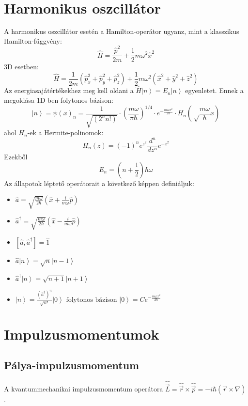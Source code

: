\documentclass[12pt]{article}
\theoremstyle{plain}
\newcommand{\ket}[1]{\left| #1 \right >}
\newcommand{\commut}[2]{\left [ #1 , #2 \right]}
\begin{document}
\section{Harmonikus oszcillátor}
A harmonikus oszcillátor esetén a Hamilton-operátor ugyanz, mint a klasszikus Hamilton-függvény:
\[
  \hat H = \frac{\hat p^2}{2m} + \frac{1}{2}m\omega^2 \hat x^2  
\]
3D esetben:
\[
    \hat H = \frac{1}{2m}(\hat p_x^2+\hat p_y^2+\hat p_z^2) + \frac{1}{2}m\omega^2 (\hat x^2 + \hat y^2 + \hat z^2)  
\]
Az energiasajátértékekhez meg kell oldani a $\hat H \ket n = E_n \ket n$ egyenletet. Ennek a megoldása 1D-ben
folytonos bázison:
\[
    \ket n = \psi(x)_n = \frac{1}{\sqrt{(2^n n!)}} \cdot \left (\frac{m\omega}{\pi\hbar}\right)^{1/4}
    \cdot e^{-\frac{m\omega x^2}{2\hbar}} \cdot H_n\left(\sqrt\frac{m\omega}{\hbar}x\right)    
\]
ahol $H_n$-ek a Hermite-polinomok:
\[
    H_n(z) = (-1)^n e^z^2 \frac{d^n}{dz^n}e^{-z^2}
\]
Ezekből 
\[
    E_n = \left(n + \frac{1}{2}\right)   \hbar \omega 
\]
\pagebreak
Az állapotok léptető operátorait a következő képpen definiáljuk:
\begin{itemize}
    \item $
        \hat a = \sqrt{\frac{m\omega}{2\hbar}}\left(\hat x + \frac{i}{m\omega}\hat p\right)
    $
    \item $
       \hat a^{\dag} = \sqrt{\frac{m\omega}{2\hbar}}\left(\hat x - \frac{i}{m\omega}\hat p\right)
    $
    \item $
        \commut{\hat a}{\hat a^{\dag}} = \hat 1
    $
    \item $
        \hat a \ket n = \sqrt n \ket{n-1}
    $
    \item $
        \hat a^{\dag} \ket n = \sqrt{n+1}\ket{n+1}
    $
    \item $
        \ket n = \frac{(\hat a^{\dag})^n}{\sqrt{n!}}\ket 0 
        \textrm{  folytonos bázison  } \ket 0 = Ce^{-\frac{m\omega x^2}{2\hbar}}
    $
\end{itemize}
\section{Impulzusmomentumok}
\subsection{Pálya-impulzusmomentum}
A kvantummechanikai impulzusmomentum operátora $\hat{\vec L} = \hat{\vec r} \times \hat{\vec p} = -i \hbar (\vec r \times \nabla)$.
\end{document}
